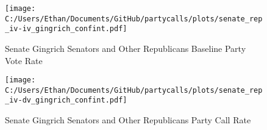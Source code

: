 \documentclass[12pt]{article}
\begin{document}
\begin{figure}[H]
	\centering
	\caption{Senate Gingrich Senators and Other Republicans Baseline Party Vote Rate}
	\texttt{[image: C:/Users/Ethan/Documents/GitHub/partycalls/plots/senate\_rep\_iv-iv\_gingrich\_confint.pdf]}
\end{figure}

\begin{figure}[H]
	\centering
	\caption{Senate Gingrich Senators and Other Republicans Party Call Rate}
	\texttt{[image: C:/Users/Ethan/Documents/GitHub/partycalls/plots/senate\_rep\_iv-dv\_gingrich\_confint.pdf]}
\end{figure}
\end{document}
